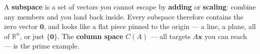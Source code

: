 \documentclass[10pt]{article}
\begin{document}
\vspace{0.10in}

\begin{remindbox}
\small A \textbf{subspace} is a set of vectors you cannot escape by \textbf{adding} or
\textbf{scaling}: combine any members and you land back inside. Every subspace therefore contains
the zero vector $\mathbf{0}$, and looks like a flat piece pinned to the origin --- a line, a
plane, all of $\mathbb{R}^n$, or just $\{\mathbf{0}\}$. The \textbf{column space} $C(A)$ --- all
targets $A\mathbf{x}$ you can reach --- is the prime example.
\end{remindbox}
\end{document}
